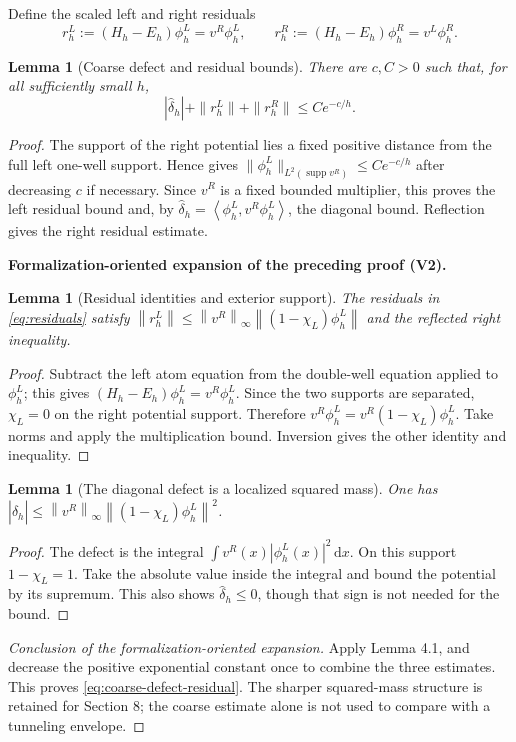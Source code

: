 \documentclass[11pt]{article}
\newtheorem{lemma}[theorem]{Lemma}
\newcommand{\formalisationparentid}{X}
\newenvironment{formalisationaddition}[1]{\par\medskip\begingroup\color{blue}\def\formalisationparentid{#1}\setcounter{formalizationsublemma}{0}\let\lemma\formalizationsublemma\let\endlemma\endformalizationsublemma
  \def\Eo{\mathcal E_h^\circ}\def\EE{\mathcal E_h}\def\phio{\phi_h^\circ}\def\phih{\phi_h}\def\Ho{H_h^{\rm atom}(v^\circ)}\def\Ha{H_h^{\rm atom}}\def\HL{H_h^{L}}\def\Dh{D_h}\def\Log{\operatorname{Log}}\def\ellh{\ell_h}\def\Gp{G_{p,h}}\def\Ast{A_{*,h}}\def\ahat{\widehat{\mathfrak a}_h}\def\ah{\mathfrak a_h}\def\rh{\widehat\rho_h}\def\deltah{\widehat\delta_h}\def\oldref##1{\textup{(##1)}}\def\interface##1{\par\noindent\textit{Analytical interface used here.} ##1\par}\def\finish{\par\noindent\textit{Conclusion of the formalization-oriented expansion.} }\par\noindent\textbf{Formalization-oriented expansion of the preceding proof (V2).}\par\smallskip
}{\par\endgroup\medskip
}
\newcommand{\norm}[1]{\left\|#1\right\|}
\newcommand{\ip}[2]{\left\langle #1,#2\right\rangle}
\newcommand{\supp}{\operatorname{supp}}
\begin{document}
Define the scaled left and right residuals
\begin{equation}\label{eq:residuals}
 r_h^L:=(H_h-E_h)\phi_h^L=v^R\phi_h^L,
 \qquad
 r_h^R:=(H_h-E_h)\phi_h^R=v^L\phi_h^R.
\end{equation}
\begin{lemma}[Coarse defect and residual bounds]\label{lem:coarse-defect-residual}
There are $c,C>0$ such that, for all sufficiently small $h$,
\begin{equation}\label{eq:coarse-defect-residual}
 |\widehat\delta_h|+\|r_h^L\|+\|r_h^R\|\le Ce^{-c/h}.
\end{equation}
\end{lemma}
\begin{proof}
The support of the right potential lies a fixed positive distance from the full
left one-well support.  Hence  gives
$\|\phi_h^L\|_{L^2(\supp v^R)}\le Ce^{-c/h}$ after decreasing $c$ if
necessary.  Since $v^R$ is a fixed bounded multiplier, this proves the left
residual bound and, by
$\widehat\delta_h=\ip{\phi_h^L}{v^R\phi_h^L}$, the diagonal bound.  Reflection
gives the right residual estimate.

\begin{formalisationaddition}{L4.4}
\begin{lemma}[Residual identities and exterior support]\label{sublemma:L4-4-residual}
The residuals in \eqref{eq:residuals} satisfy
$\norm{r_h^L}\le\norm{v^R}_\infty\norm{(1-\chi_L)\phi_h^L}$ and the reflected right inequality.
\end{lemma}
\begin{proof}
Subtract the left atom equation from the double-well equation applied to $\phi_h^L$; this gives $(H_h-E_h)\phi_h^L=v^R\phi_h^L$. Since the two supports are separated, $\chi_L=0$ on the right potential support. Therefore $v^R\phi_h^L=v^R(1-\chi_L)\phi_h^L$. Take norms and apply the multiplication bound. Inversion gives the other identity and inequality.
\end{proof}

\begin{lemma}[The diagonal defect is a localized squared mass]\label{sublemma:L4-4-diagonal}
One has
$|\deltah|\le\norm{v^R}_\infty\norm{(1-\chi_L)\phi_h^L}^2$.
\end{lemma}
\begin{proof}
The defect is the integral $\int v^R(x)|\phi_h^L(x)|^2\,\mathrm dx$. On this support $1-\chi_L=1$. Take the absolute value inside the integral and bound the potential by its supremum. This also shows $\deltah\le0$, though that sign is not needed for the bound.
\end{proof}
\finish Apply Lemma 4.1, and decrease the positive exponential constant once to combine the three estimates. This proves \eqref{eq:coarse-defect-residual}. The sharper squared-mass structure is retained for Section 8; the coarse estimate alone is not used to compare with a tunneling envelope.
\end{formalisationaddition}

\end{proof}
\end{document}
